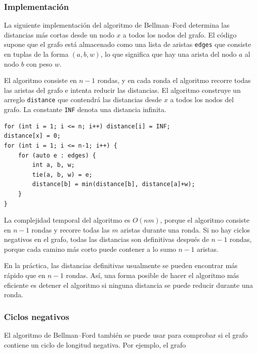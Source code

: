 \subsubsection{Implementación}

La siguiente implementación del
algoritmo de Bellman–Ford determina las distancias más cortas
desde un nodo $x$ a todos los nodos del grafo.
El código supone que el grafo está almacenado
como una lista de aristas \texttt{edges}
que consiste en tuplas de la forma $(a,b,w)$,
lo que significa que hay una arista del nodo $a$ al nodo $b$
con peso $w$.

El algoritmo consiste en $n-1$ rondas,
y en cada ronda el algoritmo recorre
todas las aristas del grafo e intenta
reducir las distancias.
El algoritmo construye un arreglo \texttt{distance}
que contendrá las distancias desde $x$
a todos los nodos del grafo.
La constante \texttt{INF} denota una distancia infinita.

\begin{lstlisting}
for (int i = 1; i <= n; i++) distance[i] = INF;
distance[x] = 0;
for (int i = 1; i <= n-1; i++) {
    for (auto e : edges) {
        int a, b, w;
        tie(a, b, w) = e;
        distance[b] = min(distance[b], distance[a]+w);
    }
}
\end{lstlisting}

La complejidad temporal del algoritmo es $O(nm)$,
porque el algoritmo consiste en $n-1$ rondas y
recorre todas las $m$ aristas durante una ronda.
Si no hay ciclos negativos en el grafo,
todas las distancias son definitivas después de $n-1$ rondas,
porque cada camino más corto puede contener a lo sumo $n-1$ aristas.

En la práctica, las distancias definitivas usualmente
se pueden encontrar más rápido que en $n-1$ rondas.
Así, una forma posible de hacer el algoritmo más eficiente
es detener el algoritmo si ninguna distancia
se puede reducir durante una ronda.

\subsubsection{Ciclos negativos}


El algoritmo de Bellman–Ford también se puede usar para
comprobar si el grafo contiene un ciclo de longitud negativa.
Por ejemplo, el grafo

